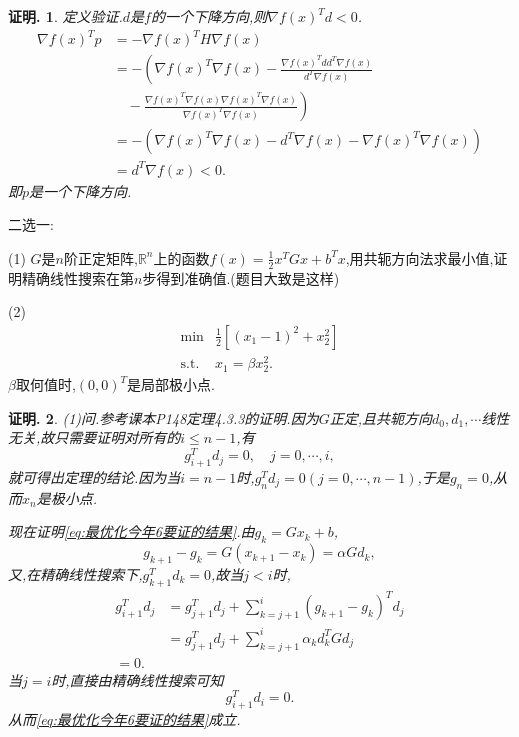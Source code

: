 \documentclass[oneside,a4paper,12pt]{ctexbook}
\theoremstyle{nonumberplain}
\newtheorem{inproof}{证明.}
\theoremstyle{nonumberplain}
\theoremstyle{nonumberplain}
\newcounter{task}
\newenvironment{task}[1]{
    \begin{tcolorbox}[enhanced,colback=blue!5!white,colframe=blue!60!black,colbacktitle=blue!40!gray,fonttitle=\bfseries,fontupper=\kaishu,fontlower=\kaishu,
        theorem={题}{task}{}{#1},attach boxed title to top left={xshift=2mm,yshift=-0.5mm},boxed title size=copy]
}{
    \end{tcolorbox}
}
\newenvironment{proof}{
    \begin{tcolorbox}[enhanced,colback=cyan!5!white,colframe=cyan!75!black,drop fuzzy shadow,breakable,arc=0mm]
        \begin{inproof}
}{
        \end{inproof}
    \end{tcolorbox}
}
\newcommand{\R}{\mathbb{R}}
\begin{document}
    \begin{proof}
        定义验证.$d$是$f$的一个下降方向,则$\nabla f(x)^Td<0$.
        \begin{align*}
            \nabla f(x)^Tp&=-\nabla f(x)^TH\nabla f(x)\\
            &=-\left(\nabla f(x)^T\nabla f(x)-\frac{\nabla f(x)^Tdd^T\nabla f(x)}{d^T\nabla f(x)}\right.\\
            &\quad-\left.\frac{\nabla f(x)^T\nabla f(x)\nabla f(x)^T\nabla f(x)}{\nabla f(x)^T\nabla f(x)}\right)\\
            &=-(\nabla f(x)^T\nabla f(x)-d^T\nabla f(x)-\nabla f(x)^T\nabla f(x))\\
            &=d^T\nabla f(x)<0.
        \end{align*}
        即$p$是一个下降方向.
    \end{proof}

    \begin{task}{最优化今年大题6}
        二选一:

        (1) $G$是$n$阶正定矩阵,$\R^n$上的函数$f(x)=\frac{1}{2}x^TGx+b^Tx$,用共轭方向法求最小值,证明精确线性搜索在第$n$步得到准确值.({\normalfont 题目大致是这样})

        (2)\begin{equation*}
            \begin{array}{rl}
                \min&\frac{1}{2}\left[(x_1-1)^2+x_2^2\right]\\
                \mathrm{s.t.}&x_1=\beta x_2^2.
            \end{array}
        \end{equation*}
        $\beta$取何值时,$(0,0)^T$是局部极小点.
    \end{task}

    \begin{proof}
        (1)问.参考课本P148定理4.3.3的证明.因为$G$正定,且共轭方向$d_0,d_1,\cdots$线性无关,故只需要证明对所有的$i\leqslant n-1$,有
        \begin{equation}
            g_{i+1}^Td_j=0,\quad j=0,\cdots,i,
            \label{eq:最优化今年6要证的结果}
        \end{equation}
        就可得出定理的结论.因为当$i=n-1$时,$g_n^Td_j=0(j=0,\cdots,n-1)$,于是$g_n=0$,从而$x_n$是极小点.
        
        现在证明\eqref{eq:最优化今年6要证的结果}.由$g_k=Gx_k+b$,
        \begin{equation*}
            g_{k+1}-g_k=G(x_{k+1}-x_k)=\alpha Gd_k,
        \end{equation*}
        又,在精确线性搜索下,$g_{k+1}^Td_k=0$,故当$j<i$时,
        \begin{align*}
            g_{i+1}^Td_j&=g_{j+1}^Td_j+\sum_{k=j+1}^i(g_{k+1}-g_k)^Td_j\\
            &=g_{j+1}^Td_j+\sum_{k=j+1}^i\alpha_kd_k^TGd_j\\
            =0.
        \end{align*}
        当$j=i$时,直接由精确线性搜索可知
        \begin{equation*}
            g_{i+1}^Td_i=0.
        \end{equation*}
        从而\eqref{eq:最优化今年6要证的结果}成立.
    \end{proof}
\end{document}
